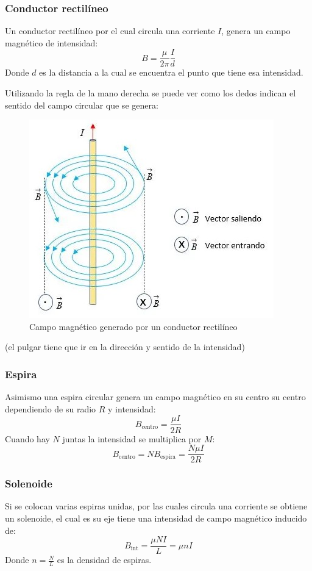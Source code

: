 \documentclass[arial,a4paper,print]{article}
\begin{document}
\subsubsection{Conductor rectilíneo}
Un conductor rectilíneo por el cual circula una corriente $I$, genera un campo magnético de intensidad:
\begin{equation*}
	B=\frac{\mu}{2\pi}\frac{I}{d}
\end{equation*}
Donde $d$ es la distancia a la cual se encuentra el punto que tiene esa intensidad. 

Utilizando la regla de la mano derecha se puede ver como los dedos indican el sentido del campo circular que se genera:
\begin{figure}[h]
	\centering
	\includegraphics[width=0.5\linewidth]{figures/magnetico_linea}
	\caption{Campo magnético generado por un conductor rectilíneo}
	\label{fig:magneticolinea}
\end{figure}
(el pulgar tiene que ir en la dirección y sentido de la intensidad)

\subsubsection{Espira}
Asimismo una espira circular genera un campo magnético en su centro su centro dependiendo de su radio $R$ y intensidad:
\begin{equation*}
	B_{\text{centro}} = \frac{\mu I}{2R}
\end{equation*}
Cuando hay $N$ juntas la intensidad se multiplica por $M$:
\begin{equation*}
	B_{\text{centro}} = NB_{\text{espira}} = \frac{N\mu I}{2R}
\end{equation*}

\subsubsection{Solenoide}
Si se colocan varias espiras unidas, por las cuales circula una corriente se obtiene un solenoide, el cual es su eje tiene una intensidad de campo magnético inducido de:
\begin{equation*}
	B_{\text{int}} = \frac{\mu NI}{L} = \mu nI
\end{equation*}
Donde $n=\frac{N}{L}$ es la densidad de espiras. 
\end{document}

